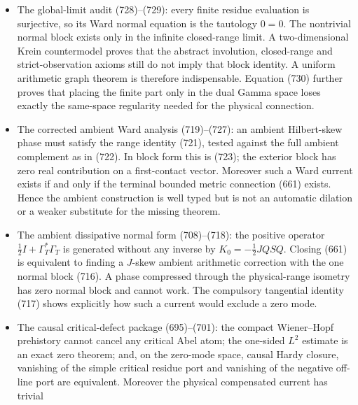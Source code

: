 \documentclass[11pt]{article}
\begin{document}
\begin{itemize}
      Volterra norm does not decay with height.  Nevertheless the full
      residue Volterra family is a uniformly bounded \(\ell^2\)-valued
      analysis operator on the Gamma form domain.  Thus the diagonal
      Bessel estimate is complete; coherent centered synthesis remains the
      cross-block problem.
\item The global-limit audit (728)--(729): every finite residue evaluation
      is surjective, so its Ward normal equation is the tautology \(0=0\).
      The nontrivial normal block exists only in the infinite closed-range
      limit.  A two-dimensional Krein countermodel proves that the abstract
      involution, closed-range and strict-observation axioms still do not
      imply that block identity.  A uniform arithmetic graph theorem is
      therefore indispensable.  Equation (730) further proves that placing
      the finite part only in the dual Gamma space loses exactly the
      same-space regularity needed for the physical connection.
\item The corrected ambient Ward analysis (719)--(727): an ambient
      Hilbert-skew phase must satisfy the range identity (721), tested
      against the full ambient complement as in (722).  In block form this
      is (723); the exterior block has zero real contribution on a
      first-contact vector.  Moreover such a Ward current exists if and
      only if the terminal bounded metric connection (661) exists.  Hence
      the ambient construction is well typed but is not an automatic
      dilation or a weaker substitute for the missing theorem.
\item The ambient dissipative normal form (708)--(718): the positive
      operator \(\frac12I+\Gamma_T^*\Gamma_T\) is generated without any
      inverse by \(K_0=-\frac12JQSQ\).  Closing (661) is equivalent to
      finding a \(J\)-skew ambient arithmetic correction with the one normal
      block (716).  A phase compressed through the physical-range isometry
      has zero normal block and cannot work.  The compulsory tangential
      identity (717) shows explicitly how such a current would exclude a
      zero mode.
\item The causal critical-defect package (695)--(701): the compact
      Wiener--Hopf prehistory cannot cancel any critical Abel atom; the
      one-sided \(L^2\) estimate is an exact zero theorem; and, on the
      zero-mode space, causal Hardy closure, vanishing of the simple
      critical residue port and vanishing of the negative off-line port are
      equivalent.  Moreover the physical compensated current has trivial

\end{itemize}
\end{document}
